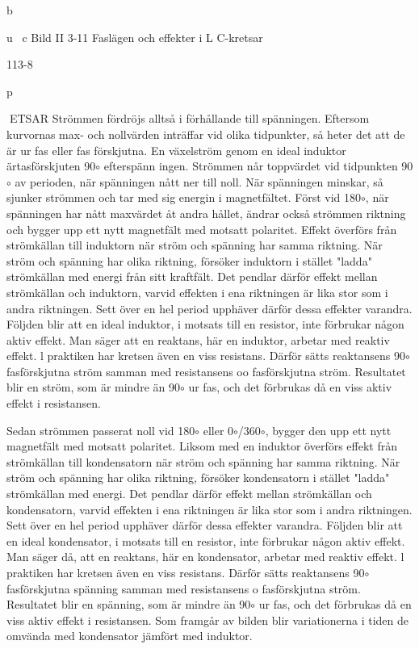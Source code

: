{b

u~
c
Bild II 3-11 Faslägen och effekter i L C-kretsar

113-8

p

ETSAR
Strömmen fördröjs alltså i förhållande till
spänningen. Eftersom kurvornas max- och
nollvärden inträffar vid olika tidpunkter, så
heter det att de är ur fas eller fas förskjutna.
En växelström genom en ideal induktor
ärtasförskjuten 90\(\circ\) efterspänn ingen. Strömmen når toppvärdet vid tidpunkten 90\(\circ\) av
perioden, när spänningen nått ner till noll.
När spänningen minskar, så sjunker strömmen och tar med sig energin i magnetfältet.
Först vid 180\(\circ\), när spänningen har nått maxvärdet åt andra hållet, ändrar också strömmen riktning och bygger upp ett nytt magnetfält med motsatt polaritet.
Effekt överförs från strömkällan till induktorn när ström och spänning har samma riktning. När ström och spänning har olika riktning, försöker induktorn i stället "ladda" strömkällan med energi från sitt kraftfält. Det pendlar därför effekt mellan strömkällan och induktorn, varvid effekten i ena riktningen är
lika stor som i andra riktningen.
Sett över en hel period upphäver därför
dessa effekter varandra. Följden blir att en
ideal induktor, i motsats till en resistor, inte
förbrukar någon aktiv effekt. Man säger att
en reaktans, här en induktor, arbetar med
reaktiv effekt.
l praktiken har kretsen även en viss resistans. Därför sätts reaktansens 90\(\circ\) fasförskjutna ström samman med resistansens oo
fasförskjutna ström. Resultatet blir en ström,
som är mindre än 90\(\circ\) ur fas, och det förbrukas då en viss aktiv effekt i resistansen.

Sedan strömmen passerat noll vid 180\(\circ\) eller
0\(\circ\)/360\(\circ\), bygger den upp ett nytt magnetfält
med motsatt polaritet.
Liksom med en induktor överförs effekt
från strömkällan till kondensatorn när ström
och spänning har samma riktning. När ström
och spänning har olika riktning, försöker
kondensatorn i stället "ladda" strömkällan
med energi. Det pendlar därför effekt mellan
strömkällan och kondensatorn, varvid effekten i ena riktningen är lika stor som i andra
riktningen.
Sett över en hel period upphäver därför
dessa effekter varandra. Följden blir att en
ideal kondensator, i motsats till en resistor,
inte förbrukar någon aktiv effekt. Man säger
då, att en reaktans, här en kondensator,
arbetar med reaktiv effekt.
l praktiken har kretsen även en viss resistans. Därför sätts reaktansens 90\(\circ\) fasförskjutna spänning samman med resistansens o fasförskjutna ström. Resultatet blir en
spänning, som är mindre än 90\(\circ\) ur fas, och
det förbrukas då en viss aktiv effekt i resistansen. Som framgår av bilden blir variationerna i tiden de omvända med kondensator
jämfört med induktor.

}
